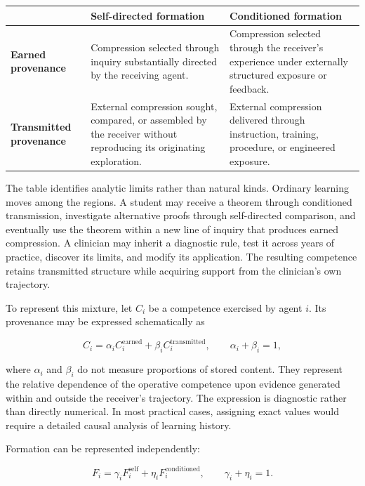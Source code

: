 \documentclass[11pt]{article}
\begin{document}
\begin{center}
\begin{tabular}{>{\raggedright\arraybackslash}p{}
                >{\raggedright\arraybackslash}p{}
                >{\raggedright\arraybackslash}p{}}
\toprule
& \textbf{Self-directed formation} & \textbf{Conditioned formation} \\
\midrule
\textbf{Earned provenance}
&
Compression selected through inquiry substantially directed by the receiving agent.
&
Compression selected through the receiver's experience under externally structured exposure or feedback.
\\[0.8em]
\textbf{Transmitted provenance}
&
External compression sought, compared, or assembled by the receiver without reproducing its originating exploration.
&
External compression delivered through instruction, training, procedure, or engineered exposure.
\\
\bottomrule
\end{tabular}
\end{center}

The table identifies analytic limits rather than natural kinds. Ordinary learning moves among the regions. A student may receive a theorem through conditioned transmission, investigate alternative proofs through self-directed comparison, and eventually use the theorem within a new line of inquiry that produces earned compression. A clinician may inherit a diagnostic rule, test it across years of practice, discover its limits, and modify its application. The resulting competence retains transmitted structure while acquiring support from the clinician's own trajectory.

To represent this mixture, let $C_i$ be a competence exercised by agent $i$. Its provenance may be expressed schematically as

\[
C_i
=
\alpha_i C_i^{\mathrm{earned}}
+
\beta_i C_i^{\mathrm{transmitted}},
\qquad
\alpha_i+\beta_i=1,
\]

where $\alpha_i$ and $\beta_i$ do not measure proportions of stored content. They represent the relative dependence of the operative competence upon evidence generated within and outside the receiver's trajectory. The expression is diagnostic rather than directly numerical. In most practical cases, assigning exact values would require a detailed causal analysis of learning history.

Formation can be represented independently:

\[
F_i
=
\gamma_i F_i^{\mathrm{self}}
+
\eta_i F_i^{\mathrm{conditioned}},
\qquad
\gamma_i+\eta_i=1.
\]
\end{document}
